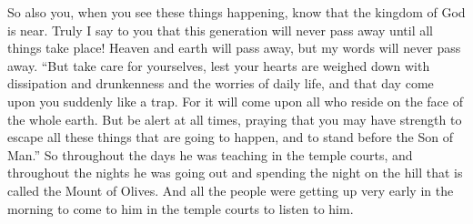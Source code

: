 \begin{biblechapter}
\verse So also you, when you see these things happening, know that the kingdom of God is near.
\verse Truly I say to you that this generation will never pass away until all things take place!
\verse Heaven and earth will pass away, but my words will never pass away.
 “But take care for yourselves, lest your hearts are weighed down with dissipation and drunkenness and the worries of daily life, and that day come upon you suddenly
\verse like a trap. For it will come upon all who reside on the face of the whole earth.
\verse But be alert at all times, praying that you may have strength to escape all these things that are going to happen, and to stand before the Son of Man.”
\verse So throughout the days he was teaching in the temple courts, and throughout the nights he was going out and spending the night on the hill that is called the Mount of Olives.
\verse And all the people were getting up very early in the morning to come to him in the temple courts to listen to him.
\end{biblechapter}

